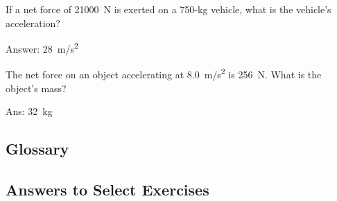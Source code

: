 \documentclass[main.tex]{subfiles}
\begin{document}
\begin{exercise}
If a net force of \SI{21000}{N} is exerted on a 750-kg vehicle, what is the vehicle's acceleration?

{\color{red} Answer: \SI{28}{m/s^2}}

\end{exercise}

\begin{exercise}
    The net force on an object accelerating at \SI{8.0}{m/s^2} is \SI{256}{N}. What is the object's mass?

    {\color{red} Ans: \SI{32}{kg}}

\end{exercise}


\subsection{Glossary}

\printnoidxglossaries

\clearpage

\subsection{Answers to Select Exercises}
\end{document}
